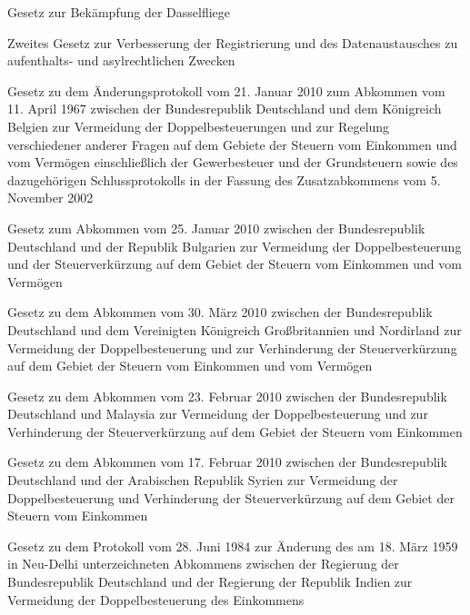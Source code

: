 \item[{DasselFlG}] Gesetz zur Bekämpfung der Dasselfliege

\item[{DAVG-2}] Zweites Gesetz zur Verbesserung der Registrierung und des Datenaustausches zu aufenthalts- und asylrechtlichen Zwecken

\item[{DBAAbkÄndProtBELG}] Gesetz zu dem Änderungsprotokoll vom 21. Januar 2010 zum Abkommen vom 11. April 1967 zwischen der Bundesrepublik Deutschland und dem Königreich Belgien zur Vermeidung der Doppelbesteuerungen und zur Regelung verschiedener anderer Fragen auf dem Gebiete der Steuern vom Einkommen und vom Vermögen einschließlich der Gewerbesteuer und der Grundsteuern sowie des dazugehörigen Schlussprotokolls in der Fassung des Zusatzabkommens vom 5. November 2002

\item[{DBAAbkBGRG}] Gesetz zum Abkommen vom 25. Januar 2010 zwischen der Bundesrepublik Deutschland und der Republik Bulgarien zur Vermeidung der Doppelbesteuerung und der Steuerverkürzung auf dem Gebiet der Steuern vom Einkommen und vom Vermögen

\item[{DBAAbkGBRG}] Gesetz zu dem Abkommen vom 30. März 2010 zwischen der Bundesrepublik Deutschland und dem Vereinigten Königreich Großbritannien und Nordirland zur Vermeidung der Doppelbesteuerung und zur Verhinderung der Steuerverkürzung auf dem Gebiet der Steuern vom Einkommen und vom Vermögen

\item[{DBAAbkMYSG}] Gesetz zu dem Abkommen vom 23. Februar 2010 zwischen der Bundesrepublik Deutschland und Malaysia zur Vermeidung der Doppelbesteuerung und zur Verhinderung der Steuerverkürzung auf dem Gebiet der Steuern vom Einkommen

\item[{DBAAbkSYRG}] Gesetz zu dem Abkommen vom 17. Februar 2010 zwischen der Bundesrepublik Deutschland und der Arabischen Republik Syrien zur Vermeidung der Doppelbesteuerung und Verhinderung der Steuerverkürzung auf dem Gebiet der Steuern vom Einkommen

\item[{DBAÄndProtG-IND}] Gesetz zu dem Protokoll vom 28. Juni 1984 zur Änderung des am 18. März 1959 in Neu-Delhi unterzeichneten Abkommens zwischen der Regierung der Bundesrepublik Deutschland und der Regierung der Republik Indien zur Vermeidung der Doppelbesteuerung des Einkommens

